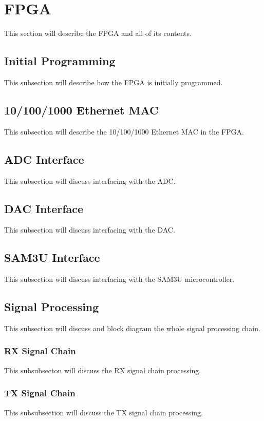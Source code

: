 \section{FPGA} %
    This section will describe the FPGA and all of its contents.
    
    \subsection{Initial Programming} %
        \label{sub:initial_programming}
        This subsection will describe how the FPGA is initially programmed.
    
    \subsection{10/100/1000 Ethernet MAC} %
        This subsection will describe the 10/100/1000 Ethernet MAC in the FPGA.
        
    \subsection{ADC Interface} %
        This subsection will discuss interfacing with the ADC.
    
    \subsection{DAC Interface} %
        This subsection will discuss interfacing with the DAC.
        
    \subsection{SAM3U Interface} %
        This subsection will discuss interfacing with the SAM3U microcontroller.
        
    \subsection{Signal Processing} %
        This subsection will discuss and block diagram the whole signal processing
        chain.
        
        \subsubsection{RX Signal Chain} %
            This subsubsecton will discuss the RX signal chain processing.
        
        \subsubsection{TX Signal Chain} %
            This subsubsection will discuss the TX signal chain processing.
